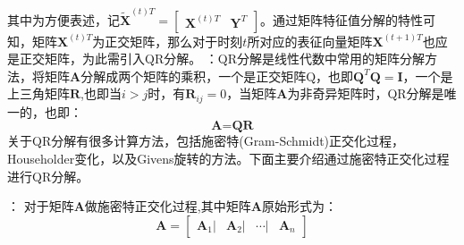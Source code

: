 其中为方便表述，记$ \tilde{\textbf{X}}^{(t)T}= \begin{bmatrix} \textbf{X}^{(t)T} & \textbf{Y}^{T}\end{bmatrix}$。通过矩阵特征值分解的特性可知，矩阵$\textbf{X}^{(t)T}$为正交矩阵，那么对于时刻$t$所对应的表征向量矩阵$\textbf{X}^{(t+1)T}$也应是正交矩阵，为此需引入QR分解。
：QR分解是线性代数中常用的矩阵分解方法，将矩阵$\textbf{A}$分解成两个矩阵的乘积，一个是正交矩阵$\text{Q}$，也即$\textbf{Q}^T\textbf{Q} = \textbf{I}$，一个是上三角矩阵$\textbf{R}$,也即当$i>j$时，有$\textbf{R}_{ij} =0$，当矩阵$\textbf{A}$为非奇异矩阵时，QR分解是唯一的，也即：
\begin{equation}
	\textbf{A} = \textbf{Q} \textbf{R}
\end{equation}
关于QR分解有很多计算方法，包括施密特(Gram-Schmidt)正交化过程，Householder变化，以及Givens旋转的方法。下面主要介绍通过施密特正交化过程进行QR分解。

：
对于矩阵$\textbf{A}$做施密特正交化过程,其中矩阵$\textbf{A}$原始形式为：
\begin{equation}
	\textbf{A} = \begin{bmatrix} \textbf{A}_1 | & \textbf{A}_2 | & \cdots | & \textbf{A}_n \end{bmatrix}
\end{equation}

